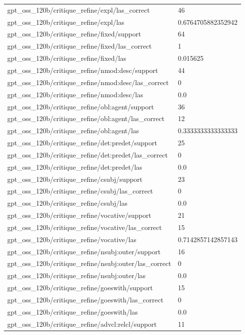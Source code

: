 \begin{tabular}{ll}
gpt\_oss\_120b/critique\_refine/expl/las\_correct & 46 \\
gpt\_oss\_120b/critique\_refine/expl/las & 0.6764705882352942 \\
gpt\_oss\_120b/critique\_refine/fixed/support & 64 \\
gpt\_oss\_120b/critique\_refine/fixed/las\_correct & 1 \\
gpt\_oss\_120b/critique\_refine/fixed/las & 0.015625 \\
gpt\_oss\_120b/critique\_refine/nmod:desc/support & 44 \\
gpt\_oss\_120b/critique\_refine/nmod:desc/las\_correct & 0 \\
gpt\_oss\_120b/critique\_refine/nmod:desc/las & 0.0 \\
gpt\_oss\_120b/critique\_refine/obl:agent/support & 36 \\
gpt\_oss\_120b/critique\_refine/obl:agent/las\_correct & 12 \\
gpt\_oss\_120b/critique\_refine/obl:agent/las & 0.3333333333333333 \\
gpt\_oss\_120b/critique\_refine/det:predet/support & 25 \\
gpt\_oss\_120b/critique\_refine/det:predet/las\_correct & 0 \\
gpt\_oss\_120b/critique\_refine/det:predet/las & 0.0 \\
gpt\_oss\_120b/critique\_refine/csubj/support & 23 \\
gpt\_oss\_120b/critique\_refine/csubj/las\_correct & 0 \\
gpt\_oss\_120b/critique\_refine/csubj/las & 0.0 \\
gpt\_oss\_120b/critique\_refine/vocative/support & 21 \\
gpt\_oss\_120b/critique\_refine/vocative/las\_correct & 15 \\
gpt\_oss\_120b/critique\_refine/vocative/las & 0.7142857142857143 \\
gpt\_oss\_120b/critique\_refine/nsubj:outer/support & 16 \\
gpt\_oss\_120b/critique\_refine/nsubj:outer/las\_correct & 0 \\
gpt\_oss\_120b/critique\_refine/nsubj:outer/las & 0.0 \\
gpt\_oss\_120b/critique\_refine/goeswith/support & 15 \\
gpt\_oss\_120b/critique\_refine/goeswith/las\_correct & 0 \\
gpt\_oss\_120b/critique\_refine/goeswith/las & 0.0 \\
gpt\_oss\_120b/critique\_refine/advcl:relcl/support & 11 \\

\end{tabular}
